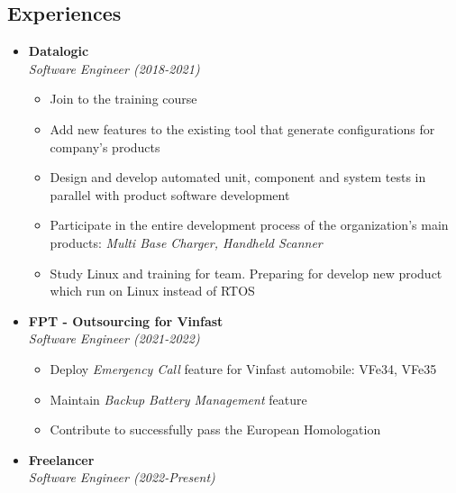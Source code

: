\documentclass[11pt,oneside,a4paper]{article}
\begin{document}
\begin{tcolorbox}
\begin{minipage}[t]{11cm}
\begin{tcolorbox}[grow to right by=0.75cm,colback=white,colframe=white]
            \section*{Experiences}
            \begin{itemize}
                \item 
                {
                    \textbf{Datalogic} \\
                    \emph{Software Engineer (2018-2021)}
                    \begin{itemize}[label=$\circ$]
                        \item {Join to the training course}
                        \item {Add new features to the existing tool that generate configurations for company's products}
                        \item {Design and develop automated unit, component and system tests in 
                        parallel with product software development}
                        \item {Participate in the entire development process of the organization's main products: 
                        \textit{Multi Base Charger, Handheld Scanner}}
                        \item {Study Linux and training for team. Preparing for develop new product which run on Linux instead of RTOS}
                    \end{itemize}
                }
                \item
                {
                    \textbf{FPT - Outsourcing for Vinfast} \\
                    \emph{Software Engineer (2021-2022)}
                    \begin{itemize}[label=$\circ$]
                        \item {Deploy \textit{Emergency Call} feature for Vinfast automobile: VFe34, VFe35}
                        \item {Maintain \textit{Backup Battery Management} feature}
                        \item {Contribute to successfully pass the European Homologation}
                    \end{itemize}
                }
                \item 
                {
                    \textbf{Freelancer} \\
                    \emph{Software Engineer (2022-Present)} \\
}
\end{itemize}
\end{tcolorbox}
\end{minipage}
\end{tcolorbox}
\end{document}

